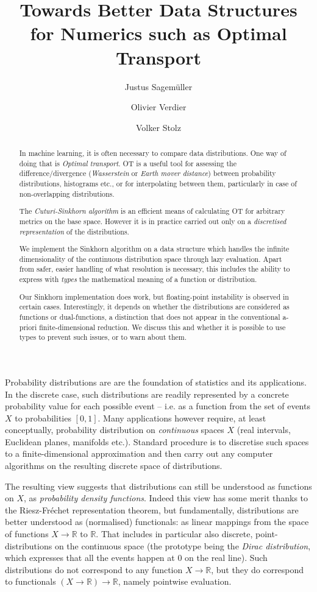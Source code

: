 \documentclass[a4paper]{easychair}
\title{Towards Better Data Structures for Numerics such as Optimal Transport}
\author{
   Justus Sagemüller\inst{1}
\and
    Olivier Verdier\inst{1}
\and
    Volker Stolz\inst{1}
}
\institute{
  Western Norway University of Applied Sciences, 
  Bergen, Norway\\
  \email{\{jsag,over,vsto\}@hvl.no}
 }
\begin{document}
\maketitle

\begin{abstract}
  In machine learning, it is often necessary to compare data distributions. One way of doing that is \emph{Optimal transport}. OT is a useful tool for assessing the difference/divergence (\emph{Wasserstein} or \emph{Earth mover distance}) between probability distributions, histograms etc., or for interpolating between them, particularly in case of non-overlapping distributions.
  
  The \emph{Cuturi-Sinkhorn algorithm} is an efficient means of calculating OT for arbitrary metrics on the base space. However it is in practice carried out only on a \emph{discretised representation} of the distributions.
  
  We implement the Sinkhorn algorithm on a data structure which handles the infinite dimensionality of the continuous distribution space through lazy evaluation. Apart from safer, easier handling of what resolution is necessary, this includes the ability to express with \emph{types} the mathematical meaning of a function or distribution.
  
  Our Sinkhorn implementation does work, but floating-point instability is observed in certain cases. Interestingly, it depends on whether the distributions are considered as functions or dual-functions, a distinction that does not appear in the conventional a-priori finite-dimensional reduction. We discuss this and whether it is possible to use types to prevent such issues, or to warn about them.
\end{abstract}

\label{sec:introduction}
\noindent%
Probability distributions are are the foundation of statistics and its applications. In the discrete case, such distributions are readily represented by a concrete probability value for each possible event -- i.e. as a function from the set of events $X$ to probabilities $[0,1]$.
Many applications however require, at least conceptually, probability distribution on \emph{continuous} spaces $X$ (real intervals, Euclidean planes, manifolds etc.).
Standard procedure is to discretise such spaces to a finite-dimensional approximation and then carry out any computer algorithms on the resulting discrete space of distributions. 

The resulting view suggests that distributions can still be understood as functions on $X$, as \emph{probability density functions}. Indeed this view has some merit thanks to the Riesz-Fréchet representation theorem, but fundamentally, distributions are better understood as (normalised) function{al}s: as linear mappings from the space of functions $X\to\mathbb{R}$ to $\mathbb{R}$.
That includes in particular also discrete, point-distributions on the continuous space (the prototype being the \emph{Dirac distribution}, which expresses that all the events happen at 0 on the real line). Such distributions do not correspond to any function $X\to\mathbb{R}$, but they do correspond to functionals $(X\to\mathbb{R})\to\mathbb{R}$, namely pointwise evaluation.
\end{document}
